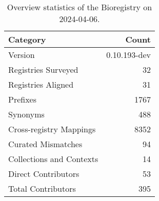 \begin{table}
\caption{Overview statistics of the Bioregistry on 2024-04-06.}
\label{tab:bioregistry-summary}
\begin{tabular}{lr}
\toprule
Category & Count \\
\midrule
Version & 0.10.193-dev \\
Registries Surveyed & 32 \\
Registries Aligned & 31 \\
Prefixes & 1767 \\
Synonyms & 488 \\
Cross-registry Mappings & 8352 \\
Curated Mismatches & 94 \\
Collections and Contexts & 14 \\
Direct Contributors & 53 \\
Total Contributors & 395 \\
\bottomrule
\end{tabular}
\end{table}
